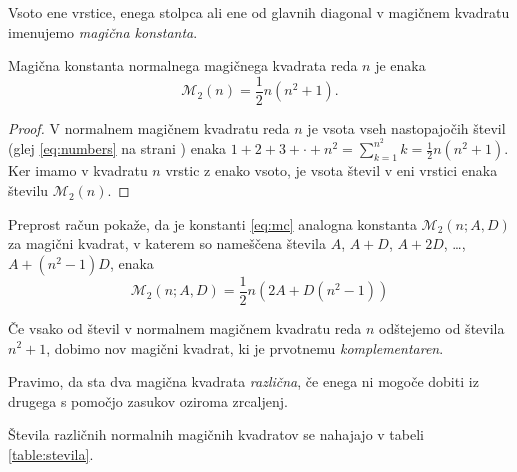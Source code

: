 \documentclass[a4paper,12pt]{article}
\newcommand{\m}{\mathcal{M}_2}
{\theoremstyle{definition}
\newtheorem{Definicija}{Definicija}}
{\theoremstyle{plain}
\newtheorem{Izrek}{Izrek}}
\begin{document}
\begin{Definicija}
      Vsoto ene vrstice, enega stolpca ali ene od glavnih diagonal
      v magičnem kvadratu imenujemo \emph{magična konstanta}.
\end{Definicija}

\begin{Izrek}
   Magična konstanta normalnega magičnega kvadrata reda \(n\)
   je enaka
   \begin{equation}
      \label{eq:mc}
      \m(n) = \frac{1}{2} n (n^2+1).
   \end{equation}
\end{Izrek}

\begin{proof}
   V normalnem magičnem kvadratu reda \(n\) je vsota vseh nastopajočih
   števil (glej \ref{eq:numbers} na strani \pageref{eq:numbers}) enaka
   \(1 + 2 + 3 + \cdot + {n^2} = \sum_{k=1}^{n^2} k = \frac{1}{2} n (n^2+1)\).
   Ker imamo
   v kvadratu \(n\) vrstic z enako vsoto, je vsota števil v eni vrstici
   enaka številu \(\m(n)\). %
\end{proof}

Preprost račun pokaže, da je konstanti \ref{eq:mc} analogna konstanta
\(\m(n;A,D)\) za magični kvadrat, v katerem so nameščena števila
\(A\), \(A+D\), \(A+2D\), \ldots, \(A+(n^2-1)D\), enaka %
\begin{equation}
   \m(n;A,D) = \frac{1}{2} n (2A + D(n^2-1))
\end{equation}

\begin{Definicija}
      Če vsako od števil v normalnem magičnem kvadratu reda \(n\) odštejemo
      od števila \(n^2 + 1\), dobimo nov magični kvadrat, ki je prvotnemu
      \emph{komplementaren}.
\end{Definicija}

\begin{Definicija}
      Pravimo, da sta dva magična kvadrata \emph{različna}, če enega ni mogoče dobiti
      iz drugega s pomočjo zasukov oziroma zrcaljenj.
\end{Definicija}

Števila različnih normalnih magičnih kvadratov se nahajajo v tabeli \ref{table:stevila}.

\end{document}
